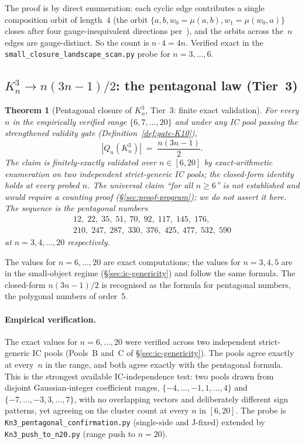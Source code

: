 \documentclass[12pt,a4paper]{article}
\newtheorem{theorem}{Theorem}[section]
\theoremstyle{definition}
\theoremstyle{remark}
\newcommand{\Kn}{K_n^3}
\newcommand{\Qn}{Q_n}
\begin{document}
The proof is by direct enumeration: each cyclic edge contributes a
single composition orbit of length~$4$ (the orbit
$\{a, b, w_0 = \mu(a, b), w_1 = \mu(w_0, a)\}$ closes after four
gauge-inequivalent directions per~\cite[\S{}orbit closure]{CFS2026}),
and the orbits across the~$n$ edges are gauge-distinct. So the
count is $n \cdot 4 = 4n$. Verified exact in the
\texttt{small\_closure\_landscape\_scan.py} probe for $n = 3, \dots, 6$.

\subsection{$\Kn \to n(3n{-}1)/2$: the pentagonal law (Tier~3)}\label{sec:law-Kn}

\begin{theorem}[Pentagonal closure of $\Kn$, Tier~3: finite exact validation]
\label{thm:Kn-pent}
For every $n$ in the empirically verified range $\{6, 7, \dots, 20\}$
and under any IC pool passing the strengthened validity gate
(Definition~\ref{def:gate-K10}),
\[
|\Qn(\Kn)| \;=\; \frac{n(3n{-}1)}{2}.
\]
The claim is finitely-exactly validated over $n \in [6, 20]$ by
exact-arithmetic enumeration on two independent strict-generic IC
pools; the closed-form identity holds at every probed $n$. The
universal claim ``for all $n \ge 6$'' is not established and would
require a counting proof (\S\ref{sec:proof-program}); we do not assert
it here.
The sequence is the pentagonal numbers
\[
\begin{array}{l}
12,\; 22,\; 35,\; 51,\; 70,\; 92,\; 117,\; 145,\; 176, \\[2pt]
210,\; 247,\; 287,\; 330,\; 376,\; 425,\; 477,\; 532,\; 590
\end{array}
\]
at $n = 3, 4, \dots, 20$ respectively.
\end{theorem}

The values for $n = 6, \dots, 20$ are exact computations; the values
for $n = 3, 4, 5$ are in the small-object regime (\S\ref{sec:ic-genericity})
and follow the same formula. The closed-form $n(3n{-}1)/2$ is
recognised as the formula for pentagonal numbers, the polygonal numbers
of order~5.

\paragraph{Empirical verification.}
The exact values for $n = 6, \dots, 20$ were verified across two
independent strict-generic IC pools (Pools~B and~C of
\S\ref{sec:ic-genericity}). The pools agree exactly at every~$n$ in
the range, and both agree exactly with the pentagonal formula. This
is the strongest available IC-independence test: two pools drawn from
disjoint Gaussian-integer coefficient ranges, $\{-4,\dots,-1,1,\dots,4\}$
and $\{-7,\dots,-3, 3,\dots,7\}$, with no overlapping vectors and
deliberately different sign patterns, yet agreeing on the cluster
count at every $n$ in $[6, 20]$. The probe is
\texttt{Kn3\_pentagonal\_confirmation.py} (single-side and J-fixed)
extended by \texttt{Kn3\_push\_to\_n20.py} (range push to $n=20$).
\end{document}
